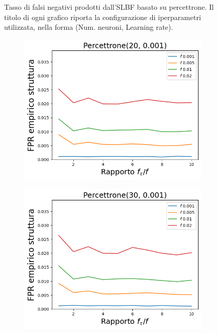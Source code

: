 \documentclass[../../main.tex]{subfiles}
\begin{document}
\begin{figure}[H]
\begin{subfigure}[b]{0.49\textwidth}
            \caption{}
            \label{fig:SLBFFNRPercettrone30}
        \end{subfigure}
        \caption{Tasso di falsi negativi prodotti dall'SLBF basato su percettrone. Il titolo di ogni grafico riporta la configurazione di iperparametri utilizzata, nella forma (Num. neuroni, Learning rate).}
        \label{fig:SLBFFNRPercettrone}
    \end{figure}
    \begin{figure}[H]
        \begin{subfigure}[b]{0.49\textwidth}
            \centering
            \includegraphics[width = \textwidth]{immagini/7/SLBF/Percettrone(20, 0.001)_FPR.png}
            \caption{}
            \label{fig:SLBFFPRPercettrone20}
        \end{subfigure}
        \begin{subfigure}[b]{0.49\textwidth}
            \centering
            \includegraphics[width = \textwidth]{immagini/7/SLBF/Percettrone(30, 0.001)_FPR.png}

\end{subfigure}
\end{figure}
\end{document}
